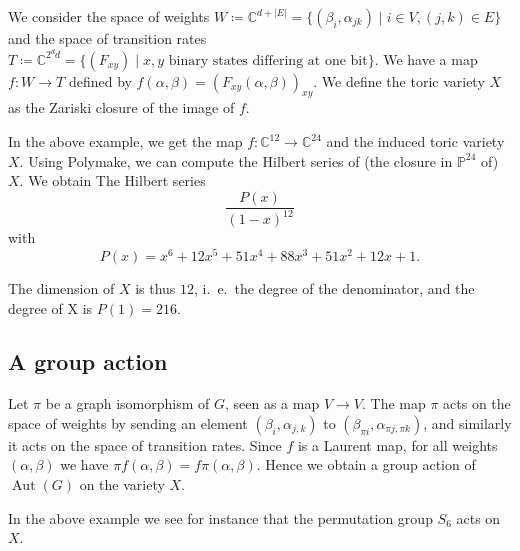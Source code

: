 We consider the space of weights $W \coloneqq \mathbb C^{d+|E|} = \{(\beta_{i},\alpha_{jk})\mid i\in V,(j,k)\in E\}$ and the space of transition rates $T \coloneqq \mathbb C^{2^{d}d} = \{(F_{xy}) \mid x,y \text{ binary states differing at one bit}\}$. We have a map
$f\colon W\to T$ defined by $f(\alpha,\beta) = (F_{xy}(\alpha,\beta))_{xy}$. We define the toric variety $X$ as the Zariski closure of the image of $f$.

In the above example, we get the map $f\colon \mathbb C^{12}\to \mathbb C^{24}$ and the induced toric variety $X$. Using Polymake, we can compute the Hilbert series of (the closure in $\mathbb P^{24}$ of) $X$. We obtain The Hilbert series
	\[\frac{P(x)}{(1-x)^{12}}\]
with \[P(x)=x^6 + 12x^5 + 51x^4 + 88x^3 + 51x^2 + 12x + 1.\]

The dimension of $X$ is thus $12$, i.\ e.\ the degree of the denominator, and the degree of X is $P(1)=216$.

\subsection*{A group action}
Let $\pi$ be a graph isomorphism of $G$, seen as a map $V\to V$. The map $\pi$ acts on the space of weights by sending an element $(\beta_i,\alpha_{j,k})$ to $(\beta_{\pi i},\alpha_{\pi{j},\pi{k}})$, and similarly it acts on the space of transition rates. Since $f$ is a Laurent map, for all weights $(\alpha,\beta)$ we have $\pi f (\alpha,\beta) = f \pi (\alpha, \beta)$. Hence we obtain a group action of $\operatorname{Aut}(G)$ on the variety $X$.

In the above example we see for instance that the permutation group $S_6$ acts on $X$.